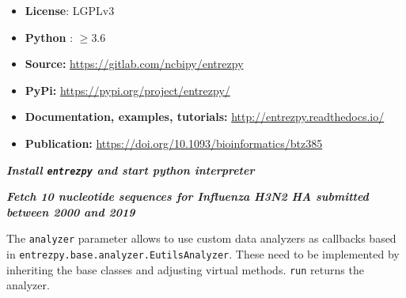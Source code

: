 \documentclass[final, a0paper, portrait]{baposter}
\newcommand{\entrezpy}{\texttt{entrezpy}\xspace}
\newcommand{\compresslist}{
    \setlength{\itemsep}{1pt}
    \setlength{\parskip}{0pt}
    \setlength{\parsep}{0pt}
}
\begin{document}
\begin{poster}
{}
{
  \small
  \begin{minipage}{0.15\linewidth}
    \begin{itemize}
    \compresslist
     \item \textbf{License}: LGPLv3
     \item \textbf{Python} : $\ge 3.6$
    \end{itemize}
  \end{minipage}
  \begin{minipage}{0.35\linewidth}
    \begin{itemize}
    \compresslist
     \item \textbf{Source:} \url{https://gitlab.com/ncbipy/entrezpy}
     \item \textbf{PyPi:} \url{https://pypi.org/project/entrezpy/}
    \end{itemize}
  \end{minipage}
  \begin{minipage}{0.5\linewidth}
    \begin{itemize}
    \compresslist
     \item \textbf{Documentation, examples, tutorials:}  \url{http://entrezpy.readthedocs.io/}
     \item \textbf{Publication:} \url{https://doi.org/10.1093/bioinformatics/btz385}
    \end{itemize}
  \end{minipage}
}
{
  \emph{\small\textbf{Install \entrezpy and start python interpreter}}
  

  \emph{\small\textbf{Fetch 10 nucleotide sequences for Influenza H3N2 HA submitted between 2000 and 2019}}
  
}

{
  \center
  
  
  
}

{
    The \texttt{analyzer} parameter allows to use custom data analyzers as
    callbacks based in \texttt{entrezpy.base.analyzer.EutilsAnalyzer}.
    These need to be implemented by inheriting the base classes and adjusting
    virtual methods. \texttt{run} returns the analyzer.
    
}



\end{poster}
\end{document}
